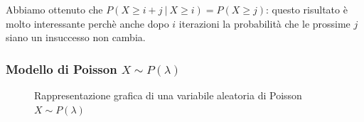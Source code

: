\noindent Abbiamo ottenuto che $P(X \geq i + j \ | \ X \geq i) = P(X \geq j)$: questo risultato è molto interessante perchè anche dopo $i$ iterazioni la probabilità che le prossime $j$ siano un insuccesso non cambia.

\subsubsection{Modello di Poisson $X \sim P{(\lambda)}$}
\begin{figure}[h]
    \centering
{}
    \caption{Rappresentazione grafica di una variabile aleatoria di Poisson $X \sim P{(\lambda)}$}
    \label{fig:mod_poisson}
\end{figure}

